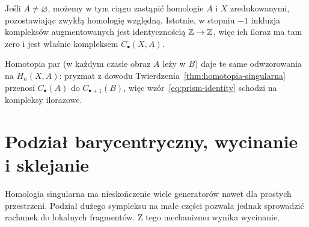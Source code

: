 Jeśli $A\ne\varnothing$, możemy w tym ciągu zastąpić homologie
$A$ i $X$ zredukowanymi, pozostawiając zwykłą homologię względną.
Istotnie, w stopniu $-1$ inkluzja kompleksów augmentowanych
jest identycznością $\mathbb{Z}\to\mathbb{Z}$, więc ich iloraz ma tam zero
i jest właśnie kompleksem $C_\bullet(X,A)$.

Homotopia par (w każdym czasie obraz $A$
leży w $B$) daje te same odwzorowania na $H_n(X,A)$:
pryzmat z dowodu Twierdzenia~\ref{thm:homotopia-singularna}
przenosi $C_\bullet(A)$ do $C_{\bullet+1}(B)$,
więc wzór~\eqref{eq:prism-identity}
schodzi na kompleksy ilorazowe.

\section{Podział barycentryczny, wycinanie i sklejanie}
\label{sec:wycinanie-homologia}

Homologia singularna ma nieskończenie wiele generatorów nawet
dla prostych przestrzeni. Podział dużego sympleksu na małe
części pozwala jednak sprowadzić rachunek do lokalnych
fragmentów. Z tego mechanizmu wynika wycinanie.

